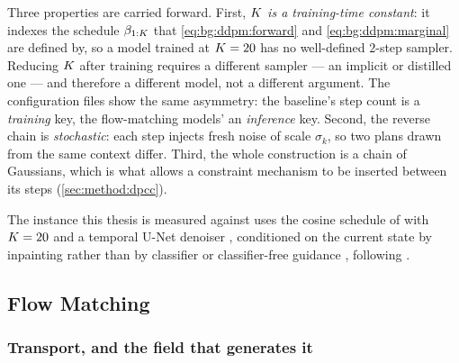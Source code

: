 
Three properties are carried forward. First, \emph{$K$ is a training-time constant}: it
indexes the schedule $\beta_{1:K}$ that \eqref{eq:bg:ddpm:forward} and
\eqref{eq:bg:ddpm:marginal} are defined by, so a model trained at $K = 20$ has no
well-defined $2$-step sampler. Reducing $K$ after training requires a different sampler
--- an implicit or distilled one \parencite{song2021denoising} --- and therefore a different
model, not a different argument. The configuration files show the same asymmetry: the baseline's
step count is a \emph{training} key, the flow-matching models' an \emph{inference} key. 
Second, the reverse chain is \emph{stochastic}: each step injects fresh noise of scale
$\sigma_{k}$, so two plans drawn from the same context differ. Third, the whole construction
is a chain of Gaussians, which is what allows a constraint mechanism to be inserted between
its steps (\autoref{sec:method:dpcc}).

The instance this thesis is measured against uses the cosine schedule of
\parencite{nichol2021improved} with $K = 20$ and a temporal U-Net denoiser
\parencite{janner2022planning}, conditioned on the current state by inpainting rather than by
classifier or classifier-free guidance \parencite{dhariwal2021diffusion,ho2022classifier}, following
\parencite[Sec.~6.1]{romer2025diffusion}.

\subsection{Flow Matching}\label{sec:method:fm}

\subsubsection*{Transport, and the field that generates it}

